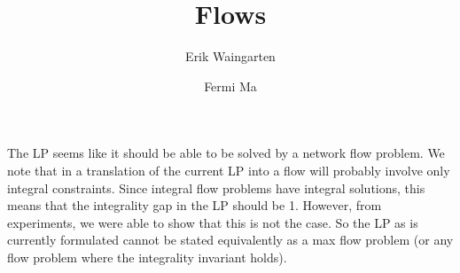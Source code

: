 \documentclass[11pt]{article}
\author{Erik Waingarten \and Fermi Ma}
\title{Flows}
\begin{document}
         
\maketitle

The LP seems like it should be able to be solved by a network flow problem. We note that in a translation of the current LP into a flow will probably involve only integral constraints. Since integral flow problems have integral solutions, this means that the integrality gap in the LP should be 1. However, from experiments, we were able to show that this is not the case. So the LP as is currently formulated cannot be stated equivalently as a max flow problem (or any flow problem where the integrality invariant holds).
\end{document}
